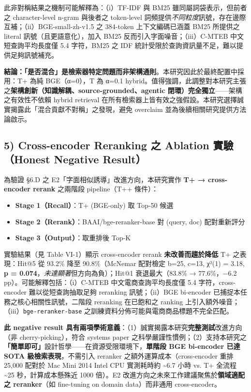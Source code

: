 此非對稱結果之機制可能解釋為：（i）TF-IDF 與 BM25 雖同屬詞袋表示，但前者之 character-level
n-gram 與後者之 token-level 詞頻提供\emph{不同粒度}訊號，存在邊際互補；（ii）BGE-small-zh-v1.5
之 384-token 上下文編碼已涵蓋 BM25 所提供之 literal 訊號（且更語意化），加入 BM25
反而引入字面噪音；（iii）C-MTEB 中文短查詢平均長度僅 5.4 字符，BM25 之 IDF
統計受限於查詢資訊量不足，難以提供足夠訊號補充。

\textbf{結論：「是否混合」是檢索器特定問題而非架構通則}。本研究因此於最終配置中採用：T+
為純 BGE（α=0），T 為 α=0.1 hybrid。值得強調，此調整對本研究主張之\textbf{架構創新（知識解耦、source-grounded、agentic
閉環）完全獨立}——架構之有效性不依賴 hybrid retrieval 在所有檢索器上皆有效之強假設。本研究選擇誠實揭露此「混合貢獻不對稱」之發現，避免
overclaim 並為後續相關研究提供方法論啟示。

\subsection{5) Cross-encoder Reranking 之 Ablation 實驗（Honest Negative Result）}\label{ux03b1blation-ux6b63ux5be6ux9a57}

為驗證 §6.D 之 E2「字面相似誘導」改進方向，本研究實作 \textbf{T+ → cross-encoder rerank} 之兩階段 pipeline（T++ 條件）：

\begin{itemize}
\tightlist
\item
  \textbf{Stage 1（Recall）}：T+ (BGE-only) 取 Top-50 候選
\item
  \textbf{Stage 2（Rerank）}：BAAI/bge-reranker-base 對 (query, doc) 配對重新評分
\item
  \textbf{Stage 3（Output）}：取重排後 Top-K
\end{itemize}

實驗結果（見 Table VI-1）顯示 cross-encoder rerank \textbf{未改善而趨於降低}
T+ 之表現：Hit@5 從 93.2\% 降至 90.8\%（McNemar 配對檢定 b=25, c=13,
χ²(1) = 3.18, \textbf{p = 0.074}，\emph{未達顯著}但方向為負）；Hit@1
衰退最大（83.8\% → 77.6\%，−6.2 pp）。可能解釋包括：（i）C-MTEB
中文電商查詢平均長度僅 5.4 字符，cross-encoder 難以從短查詢抽取足夠
reranking 訊號；（ii）BGE bi-encoder 已捕捉本任務之核心相關性訊號，二階段
reranking 在已飽和之 ranking 上引入額外噪音；（iii）\texttt{bge-reranker-base}
之訓練資料分佈可能與電商商品標題不完全匹配。

\textbf{此 negative result 具有兩項學術意義}：（1）誠實揭露本研究\textbf{完整測試}改進方向（非
cherry-picking），符合 systems paper 之科學嚴謹性慣例；（2）支持本研究之\textbf{「簡單即可」}設計哲學——在資源受限環境下，\textbf{單階段
BGE bi-encoder 已達 SOTA 級檢索表現}，不需引入 reranker 之額外運算成本（cross-encoder
重排 25,000 配對於 Mac Mini 2014 Intel CPU 實測耗時約 \textasciitilde 6.7 小時 vs.
T+ 全流程 \textasciitilde 25 秒，計算成本懸殊近 1000 倍）。E2 改進方向之未來工作建議聚焦於\textbf{領域適配之
reranker}（如 fine-tuning on domain data）而非通用 cross-encoder。

